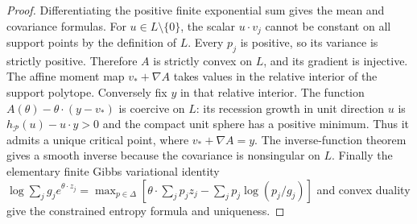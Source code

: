 \documentclass[12pt,a4paper]{article}
\begin{document}
\begin{proof}
Differentiating the positive finite exponential sum gives the mean
and covariance formulas. For $u\in L\setminus\{0\}$, the scalar
$u\cdot v_j$ cannot be constant on all support points by the
definition of $L$. Every $p_j$ is positive, so its variance is
strictly positive. Therefore $A$ is strictly convex on $L$, and
its gradient is injective. The affine moment map $v_*+\nabla A$
takes values in the relative interior of the support polytope.
Conversely fix $y$ in that relative interior. The function
$A(\theta)-\theta\cdot(y-v_*)$ is coercive on $L$: its recession growth in
unit direction $u$ is $h_{\mathcal P}(u)-u\cdot y>0$ and the compact
unit sphere has a positive minimum. Thus it admits a unique critical
point, where $v_*+\nabla A=y$. The inverse-function theorem gives a smooth
inverse because the covariance is nonsingular on $L$.
Finally the elementary finite Gibbs variational identity
$\log\sum_jg_je^{\theta\cdot z_j}
=\max_{p\in\Delta}[\theta\cdot\sum_jp_jz_j
 -\sum_jp_j\log(p_j/g_j)]$
and convex duality give the constrained entropy formula and uniqueness.
\end{proof}
\end{document}
